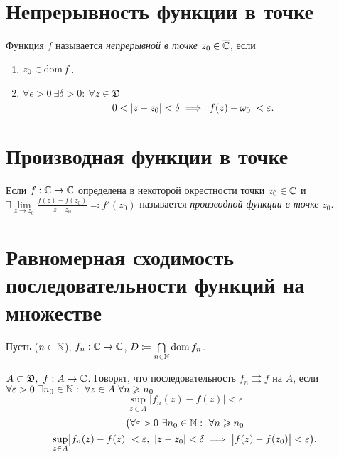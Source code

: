 \section{Непрерывность функции в точке}

\begin{definition}
	Функция $f$ называется \emph{непрерывной в точке} $z_0 \in \overline{\mathbb{C}}$, если
	\begin{enumerate}
		\item $z_0 \in \operatorname{dom} f$.
		\item $\forall \epsilon > 0 \ \exists \delta > 0: \ \forall z \in \mathfrak{D}$
		      \[
			      0 < \left\lvert z - z_0\right\rvert < \delta \implies \left\lvert f(z) - \omega_0\right\rvert < \varepsilon.
		      \]
	\end{enumerate}
\end{definition}

\section{Производная функции в точке}

\begin{definition}
	Если $f: \mathbb{C} \rightarrow \mathbb{C}$ определена в некоторой окрестности точки $z_0 \in \mathbb{C}$ и $\exists \underset{z \rightarrow z_0}{\lim}\frac{f(z) - f(z_0)}{z - z_0} \eqqcolon f'(z_0)$ называется \emph{производной функции в точке} $z_0$.
\end{definition}

\newpage

\section{Равномерная сходимость последовательности функций на множестве}

\begin{definition}
	Пусть ($n\in \mathbb{N}$), $f_n : \mathbb{C} \rightarrow \mathbb{C}$, $D \coloneq \underset{n \in \mathbb{N}}{\bigcap}\operatorname{dom} f_n$.

	$A \subset \mathfrak{D}, \ f: A \rightarrow \mathbb{C}$. Говорят, что последовательность $f_n \rightrightarrows f$ на $A$, если $\forall \varepsilon> 0 \ \exists n_0 \in \mathbb{N}: \ \forall z \in A \ \forall n \geqslant n_0$
	\[
		\underset{z \in A}{\sup}\big|f_n(z) - f(z)\big| < \epsilon
	\]
	\begin{multline*}
		\big(\forall \epsilon > 0 \ \exists n_0 \in \N : \ \forall n \geqslant n_0 \\
		\underset{z \in A}{\sup}\big|f_n(z)-f(z)\big| < \epsilon, \ \abs{z-z_0} < \delta \implies \big|f(z) - f(z_0)\big|< \epsilon\big).
	\end{multline*}
\end{definition}

